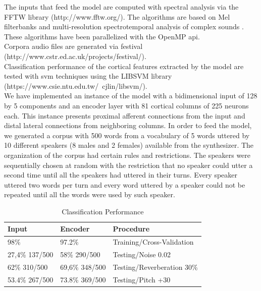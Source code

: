 \documentclass[11pt,a4paper]{article}
\begin{document}
The inputs that feed the model are computed
with spectral analysis via the FFTW library (http://www.fftw.org/).
The algorithms are based on 
Mel filterbanks and multi-resolution
spectrotemporal analysis of complex sounds \cite{taishih_2005}.
These algorithms have been parallelized with the OpenMP \gls{api}. \\

Corpora audio files are generated via \gls{festival} \\ (http://www.cstr.ed.ac.uk/projects/festival/). \\

Classification performance of the cortical features extracted by the model are tested with
\gls{svm} techniques using the LIBSVM library (https://www.csie.ntu.edu.tw/~cjlin/libsvm/). \\

We have implemented an instance of the model with a bidimensional input
of 128 by 5 components and an encoder layer
with 81 cortical columns of 225 neurons each.
This instance presents proximal afferent connections
from the input and distal lateral connections from
neighboring columns.
In order to feed the model, we generated a corpus with 500 words from a vocabulary of
5 words uttered by 10 different speakers (8 males and 2 females) available from the synthesizer.
The organization of the corpus had certain rules and restrictions.
The speakers were sequentially chosen at random with the restriction that no speaker could
utter a second time until all the speakers had uttered in their turns.
Every speaker uttered two words per turn and every word uttered by a speaker
could not be repeated until all the words were used by such speaker. \\

\begin{table}[]
\centering
\caption{Classification Performance}
\label{classification_performances}
\begin{tabular}{|l|l|l|}
\hline
Input          & Encoder        & Procedure                  \\ \hline
98\%           & 97.2\%         & Training/Cross-Validation  \\ \hline
27,4\% 137/500 & 58\% 290/500   & Testing/Noise 0.02         \\ \hline
62\% 310/500   & 69,6\% 348/500 & Testing/Reverberation 30\% \\ \hline
53.4\% 267/500 & 73.8\% 369/500 & Testing/Pitch +30          \\ \hline
\end{tabular}
\end{table}
\end{document}
